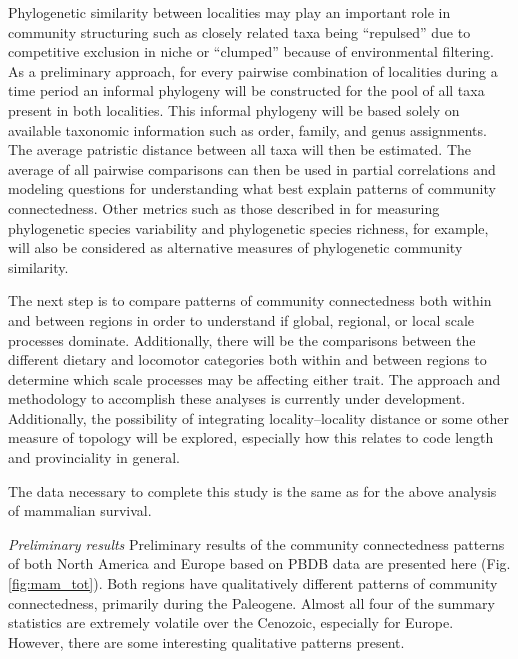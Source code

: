 \documentclass[12pt,letterpaper]{article}
\begin{document}
Phylogenetic similarity between localities may play an important role in community structuring \citep{Webb2002} such as closely related taxa being ``repulsed'' due to competitive exclusion in niche or ``clumped'' because of environmental filtering. As a preliminary approach, for every pairwise combination of localities during a time period an informal phylogeny will be constructed for the pool of all taxa present in both localities. This informal phylogeny will be based solely on available taxonomic information such as order, family, and genus assignments. The average patristic distance between all taxa will then be estimated. The average of all pairwise comparisons can then be used in partial correlations and modeling questions for understanding what best explain patterns of community connectedness. Other metrics such as those described in \citet{Helmus2007a} for measuring phylogenetic species variability and phylogenetic species richness, for example, will also be considered as alternative measures of phylogenetic community similarity.

The next step is to compare patterns of community connectedness both within and between regions in order to understand if global, regional, or local scale processes dominate. Additionally, there will be the comparisons between the different dietary and locomotor categories both within and between regions to determine which scale processes may be affecting either trait. The approach and methodology to accomplish these analyses is currently under development. Additionally, the possibility of integrating locality--locality distance or some other measure of topology will be explored, especially how this relates to code length and provinciality in general.

The data necessary to complete this study is the same as for the above analysis of mammalian survival.

\textit{Preliminary results}
Preliminary results of the community connectedness patterns of both North America and Europe based on PBDB data are presented here (Fig. \ref{fig:mam_tot}). Both regions have qualitatively different patterns of community connectedness, primarily during the Paleogene. Almost all four of the summary statistics are extremely volatile over the Cenozoic, especially for Europe. However, there are some interesting qualitative patterns present.
\end{document}

